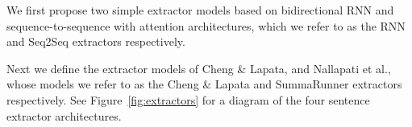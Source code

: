 We first propose two simple extractor models based on bidirectional RNN 
and sequence-to-sequence with attention architectures, 
which we refer to as the RNN and 
Seq2Seq extractors respectively.

Next we define the extractor models of Cheng \& Lapata, and Nallapati et al.,
whose models we refer to as the Cheng \& Lapata and SummaRunner extractors
respectively.
See Figure~\ref{fig:extractors} for a diagram of the 
four sentence extractor architectures.




